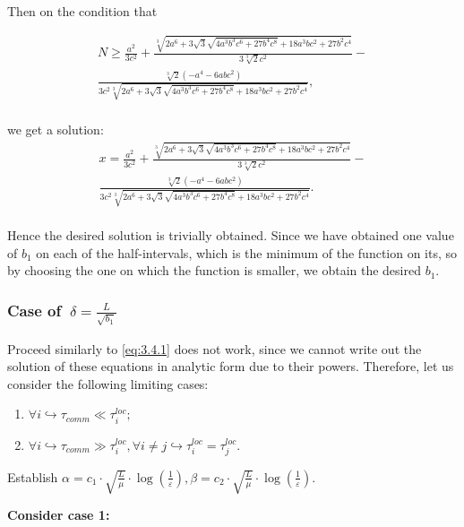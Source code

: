 \documentclass{article}
\begin{document}
Then on the condition that 

\begin{gather*}
    N \geq \frac{a^2}{3 c^2}+\frac{\sqrt[3]{2 a^6+3 \sqrt{3} \sqrt{4 a^3 b^3 c^6+27 b^4 c^8}+18 a^3 b c^2+27 b^2 c^4}}{3 \sqrt[3]{2} c^2}-  \\
    \frac{\sqrt[3]{2}\left(-a^4-6 a b c^2\right) } 
    {3 c^2 \sqrt[3]{2 a^6+3 \sqrt{3} \sqrt{4 a^3 b^3 c^6+27 b^4 c^8}+18 a^3 b c^2+27 b^2 c^4}}, \\
\end{gather*}

we get a solution: \\

\begin{gather*}
     x=\frac{a^2}{3 c^2}+\frac{\sqrt[3]{2 a^6+3 \sqrt{3} \sqrt{4 a^3 b^3 c^6+27 b^4 c^8}+18 a^3 b c^2+27 b^2 c^4}}{3 \sqrt[3]{2} c^2}- \\ \frac{\sqrt[3]{2}\left(-a^4-6 a b c^2\right)} 
    {3 c^2 \sqrt[3]{2 a^6+3 \sqrt{3} \sqrt{4 a^3 b^3 c^6+27 b^4 c^8}+18 a^3 b c^2+27 b^2 c^4}}.  \\
\end{gather*}

Hence the desired solution is trivially obtained. Since we have obtained one value of $b_1$ on each of the half-intervals, which is the minimum of the function on its, so by choosing the one on which the function is smaller, we obtain the desired $b_1$.

\subsubsection{Case of $~\delta = \frac{L}{\sqrt{b_1}}$}\label{eq:3.4.2}
Proceed similarly to \ref{eq:3.4.1} does not work, since we cannot write out the solution of these equations in analytic form due to their powers.
Therefore, let us consider the following limiting cases:
\begin{enumerate}
    \item $\forall i\hookrightarrow \tau_{comm} \ll \tau_i^{loc};$
    \item $\forall i\hookrightarrow \tau_{comm} \gg \tau_i^{loc}, \forall i\neq j\hookrightarrow \tau_i^{loc} = \tau_j^{loc}.$
\end{enumerate}

Establish $\alpha = c_1\cdot\sqrt{\frac{L}{\mu}}\cdot \log(\frac{1}{\varepsilon}),\beta = c_2\cdot\sqrt{\frac{L}{\mu}}\cdot \log(\frac{1}{\varepsilon}) $.

\textbf{Consider case 1:}
\end{document}
